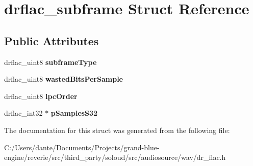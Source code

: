 \hypertarget{structdrflac__subframe}{}\section{drflac\+\_\+subframe Struct Reference}
\label{structdrflac__subframe}
\subsection*{Public Attributes}
\begin{DoxyCompactItemize}
\item 
\mbox{\label{structdrflac__subframe_a6e00e12ce74b76f1fcdc78d8d00bef73}} 
drflac\+\_\+uint8 {\bfseries subframe\+Type}
\item 
\mbox{\label{structdrflac__subframe_abd3a8d468312bf6426db6e8125a8ebb7}} 
drflac\+\_\+uint8 {\bfseries wasted\+Bits\+Per\+Sample}
\item 
\mbox{\label{structdrflac__subframe_afe4e457d6fc4a858b6aab8993666b199}} 
drflac\+\_\+uint8 {\bfseries lpc\+Order}
\item 
\mbox{\label{structdrflac__subframe_ae899af4ae4f6d830e4fce95d5886517f}} 
drflac\+\_\+int32 $\ast$ {\bfseries p\+Samples\+S32}
\end{DoxyCompactItemize}


The documentation for this struct was generated from the following file\+:\begin{DoxyCompactItemize}
\item 
C\+:/\+Users/dante/\+Documents/\+Projects/grand-\/blue-\/engine/reverie/src/third\+\_\+party/soloud/src/audiosource/wav/dr\+\_\+flac.\+h\end{DoxyCompactItemize}

